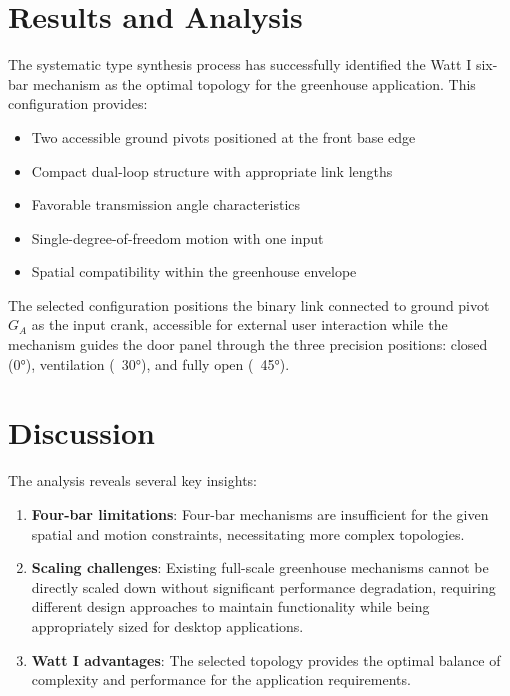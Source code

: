 \documentclass[12pt]{article}
\begin{document}
\section{Results and Analysis}
\label{sec:results}

The systematic type synthesis process has successfully identified the Watt I six-bar mechanism as the optimal topology for the greenhouse application. This configuration provides:

\begin{itemize}
    \item Two accessible ground pivots positioned at the front base edge
    \item Compact dual-loop structure with appropriate link lengths
    \item Favorable transmission angle characteristics
    \item Single-degree-of-freedom motion with one input
    \item Spatial compatibility within the greenhouse envelope
\end{itemize}

The selected configuration positions the binary link connected to ground pivot $G_A$ as the input crank, accessible for external user interaction while the mechanism guides the door panel through the three precision positions: closed (0°), ventilation (~30°), and fully open (~45°).

\section{Discussion}
\label{sec:discussion}

The analysis reveals several key insights:

\begin{enumerate}
    \item \textbf{Four-bar limitations}: Four-bar mechanisms are insufficient for the given spatial and motion constraints, necessitating more complex topologies.
    
    \item \textbf{Scaling challenges}: Existing full-scale greenhouse mechanisms cannot be directly scaled down without significant performance degradation, requiring different design approaches to maintain functionality while being appropriately sized for desktop applications.
    
    \item \textbf{Watt I advantages}: The selected topology provides the optimal balance of complexity and performance for the application requirements.
\end{enumerate}
\end{document}
